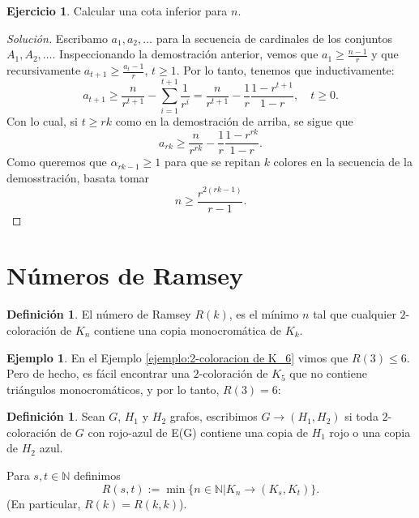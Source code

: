 \documentclass[12pt]{report}
\theoremstyle{plain}
\theoremstyle{definition}
\newtheorem{definition}[theorem]{Definición}
\newtheorem{example}[theorem]{Ejemplo}
\newtheorem{exercise}[theorem]{Ejercicio}
\newenvironment{solution}{\begin{proof}[Solución]}{\end{proof}}
\newcommand{\naturals}{\mathbb{N}}
\begin{document}
\begin{exercise}
Calcular una cota inferior para $n$.
\end{exercise}
\begin{solution}
Escribamo $a_1, a_2, \ldots$ para la secuencia de cardinales de los conjuntos $A_1, A_2, \ldots$. Inspeccionando la demostración anterior, vemos que $a_1 \geq \frac{n-1}{r}$ y que recursivamente $a_{t+1} \geq \frac{a_t - 1}{r}$, $t \geq 1$. Por lo tanto, tenemos que inductivamente:
\[
    a_{t+1} \geq \frac{n}{r^{t+1}} - \sum_{i = 1}^{t+1} \frac{1}{r^i} = \frac{n}{r^{t+1}}  - \frac{1}{r} \frac{1 - r^{t+1}}{1 - r}, \quad t \geq 0.
\]
Con lo cual, si $t \geq r k$ como en la demostración de arriba, se sigue que
\[
    a_{rk} \geq  \frac{n}{r^{rk}} - \frac{1}{r} \frac{1 - r^{rk}}{1 -r}.
\]
Como queremos que $\alpha_{rk-1} \geq 1$ para que se repitan $k$ colores en la secuencia de la demosstración, basata tomar
\[
    \boxed{n \geq \frac{r^{2(rk-1)}}{r-1}.}
\]
\end{solution}

\section{Números de Ramsey}

\begin{definition}
El número de Ramsey $R(k)$, es el mínimo $n$ tal que cualquier $2$-coloración de $K_n$ contiene una copia monocromática de $K_k$.
\end{definition}


\begin{example}
En el Ejemplo \ref{ejemplo:2-coloracion de K_6} vimos que $R(3) \leq 6$. Pero de hecho, es fácil encontrar una $2$-coloración de $K_5$ que no contiene triángulos monocromáticos, y por lo tanto, $R(3) = 6$:

\end{example}


\begin{definition}
Sean $G$, $H_1$ y $H_2$ grafos, escribimos $G \to (H_1, H_2)$ si toda $2$-coloración de $G$ con rojo-azul de E(G) contiene una copia de $H_1$ rojo o una copia de $H_2$ azul.

Para $s,t \in \naturals$ definimos
\[
    R(s,t) := \min \{n \in \naturals | K_n \to (K_s,K_t)\}.
\]
(En particular, $R(k) = R(k,k)$).
\end{definition}
\end{document}
